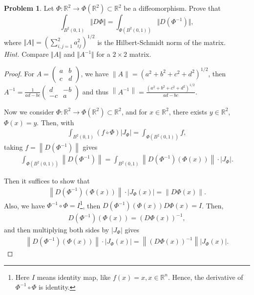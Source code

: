 \documentclass[11pt]{article}
\theoremstyle{definition}
\newtheorem{problem}{Problem}
\theoremstyle{definition}
\begin{document}
\medskip

\begin{problem}
Let $\Phi:\mathbb{R}^2\to\Phi(\mathbb{R}^2)\subset\mathbb{R}^2$ be a diffeomorphism. Prove that
$$ \int_{B^2(0,1)}\Vert D\Phi\Vert = \int_{\Phi(B^2(0,1))} \Vert D(\Phi^{-1})\Vert,
$$
where $\Vert A\Vert=(\sum_{i,j=1}^2 a_{ij}^2)^{1/2}$ is the Hilbert-Schmidt norm of the matrix.\\
{\em Hint.} Compare $\Vert A\Vert$ and $\Vert A^{-1}\Vert$ for a $2\times 2$ matrix.
\end{problem}
\begin{proof}
For $A = \begin{pmatrix} 
    a & b \\
    c & d
\end{pmatrix}$, we have $\|A\| = \left(a^2 + b^2 + c^2 + d^2\right)^{1/2}$, then $A^{-1} = \frac{1}{ad - bc}\begin{pmatrix} 
    d & -b \\
    -c & a
\end{pmatrix}$ and thus $\left\|A^{-1}\right\| = \frac{\left(a^2 + b^2 + c^2 + d^2\right)^{1/2}}{ad - bc}$. 

Now we consider $\Phi: \mathbb{R}^2 \to \Phi\left(\mathbb{R}^2\right) \subset \mathbb{R}^2$, and for $x \in \mathbb{R}^2$, there exists $y \in \mathbb{R}^2$, $\Phi(x) = y$. Then, with 
\begin{align*}
    \int_{B^2(0,1)} (f \circ \Phi)\left|J_\Phi\right| = \int_{\Phi\left(B^2(0,1)\right)} f,
\end{align*}
taking $f = \left\|D\left(\Phi^{-1}\right) \right\|$ gives
\begin{align*}
    \int_{\Phi\left(B^2(0,1)\right)} \left\|D\left(\Phi^{-1}\right) \right\| = \int_{B^2(0,1)} \left\|D\left(\Phi^{-1}\right) (\Phi(x)) \right\| \cdot \left|J_\Phi\right|.
\end{align*}

Then it suffices to show that
\begin{align*}
    \left\|D\left(\Phi^{-1}\right) (\Phi(x)) \right\| \cdot \left|J_\Phi(x)\right| = \left\|D\Phi(x) \right\|.
\end{align*}
Also, we have $\Phi^{-1} \circ \Phi = I$\footnote{Here $I$ means identity map, like $f(x) = x, x \in \mathbb{R}^n$. Hence, the derivative of $\Phi^{-1} \circ \Phi$ is identity.}, then $D\left(\Phi^{-1}\right)(\Phi(x)) D\Phi(x) = I$. Then,
\begin{align*}
    D\left(\Phi^{-1}\right)(\Phi(x)) = \left(D\Phi(x)\right)^{-1},
\end{align*}
and then multiplying both sides by $\left|J_\Phi\right|$ gives
\begin{align*}
    \left\|D\left(\Phi^{-1}\right) (\Phi(x)) \right\| \cdot \left|J_\Phi(x)\right| = \left\|\left(D\Phi(x)\right)^{-1} \right\| \left|J_\Phi(x)\right|.
\end{align*}


\end{proof}
\end{document}
